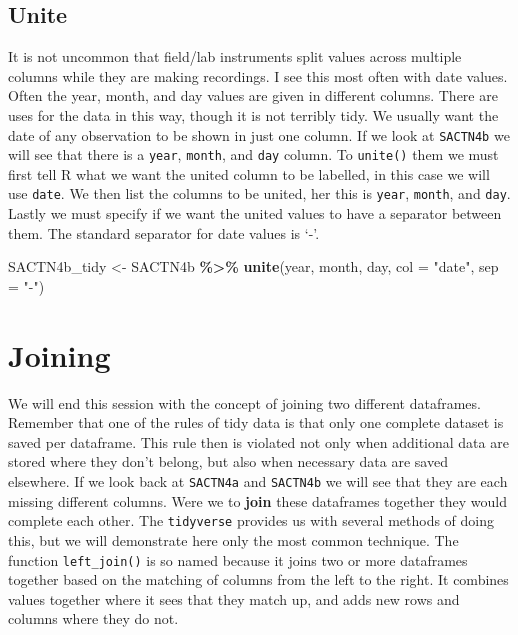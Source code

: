 \documentclass[
]{book}
\newenvironment{Shaded}{\begin{snugshade}}{\end{snugshade}}
\newcommand{\DataTypeTok}[1]{\textcolor[rgb]{0.13,0.29,0.53}{#1}}
\newcommand{\KeywordTok}[1]{\textcolor[rgb]{0.13,0.29,0.53}{\textbf{#1}}}
\newcommand{\NormalTok}[1]{#1}
\newcommand{\OperatorTok}[1]{\textcolor[rgb]{0.81,0.36,0.00}{\textbf{#1}}}
\newcommand{\StringTok}[1]{\textcolor[rgb]{0.31,0.60,0.02}{#1}}
\begin{document}
\hypertarget{unite}{%
\subsection{Unite}\label{unite}}

It is not uncommon that field/lab instruments split values across multiple columns while they are making recordings. I see this most often with date values. Often the year, month, and day values are given in different columns. There are uses for the data in this way, though it is not terribly tidy. We usually want the date of any observation to be shown in just one column. If we look at \texttt{SACTN4b} we will see that there is a \texttt{year}, \texttt{month}, and \texttt{day} column. To \texttt{unite()} them we must first tell R what we want the united column to be labelled, in this case we will use \texttt{date}. We then list the columns to be united, her this is \texttt{year}, \texttt{month}, and \texttt{day}. Lastly we must specify if we want the united values to have a separator between them. The standard separator for date values is `-'.

\begin{Shaded}
\begin{Highlighting}[]
\NormalTok{SACTN4b\_tidy <{-}}\StringTok{ }\NormalTok{SACTN4b }\OperatorTok{\%>\%}\StringTok{ }
\StringTok{  }\KeywordTok{unite}\NormalTok{(year, month, day, }\DataTypeTok{col =} \StringTok{"date"}\NormalTok{, }\DataTypeTok{sep =} \StringTok{"{-}"}\NormalTok{)}
\end{Highlighting}
\end{Shaded}

\hypertarget{joining}{%
\section{Joining}\label{joining}}

We will end this session with the concept of joining two different dataframes. Remember that one of the rules of tidy data is that only one complete dataset is saved per dataframe. This rule then is violated not only when additional data are stored where they don't belong, but also when necessary data are saved elsewhere. If we look back at \texttt{SACTN4a} and \texttt{SACTN4b} we will see that they are each missing different columns. Were we to \textbf{join} these dataframes together they would complete each other. The \texttt{tidyverse} provides us with several methods of doing this, but we will demonstrate here only the most common technique. The function \texttt{left\_join()} is so named because it joins two or more dataframes together based on the matching of columns from the left to the right. It combines values together where it sees that they match up, and adds new rows and columns where they do not.
\end{document}
